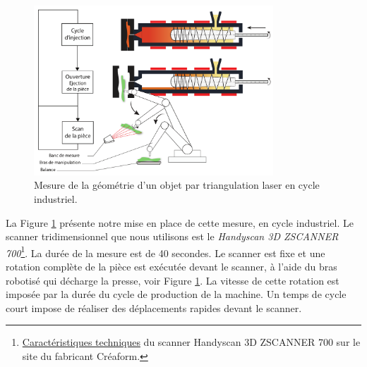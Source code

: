 \begin{figure}[tbhp]
	\centering
	\includegraphics[width=0.8\textwidth]{../Chap2/Figures/online_scan.pdf}
	\caption{Mesure de la géométrie d'un objet par triangulation laser en cycle industriel.}
	\label{fig:online_scan}
\end{figure}
La Figure \ref{fig:online_scan} présente notre mise en place de cette mesure, en cycle industriel.
Le scanner tridimensionnel que nous utilisons est le \textit{Handyscan 3D ZSCANNER 700}\footnote{\href{https://www.creaform3d.com/fr/soutien-la-clientele/produits-retires/handyscan-3d-de-1re-generation-zscanner-700}{Caractéristiques techniques} du scanner Handyscan 3D ZSCANNER 700 sur le site du fabricant Créaform.}.
La durée de la mesure est de 40 secondes.
Le scanner est fixe et une rotation complète de la pièce est exécutée devant le scanner, à l'aide du bras robotisé qui décharge la presse, voir Figure \ref{fig:online_scan}.
La vitesse de cette rotation est imposée par la durée du cycle de production de la machine.
Un temps de cycle court impose de réaliser des déplacements rapides devant le scanner.


